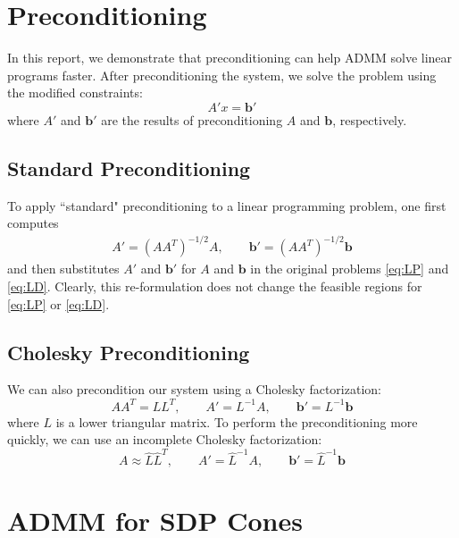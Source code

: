 \documentclass{article}
\begin{document}
\section{Preconditioning}
In this report, we demonstrate that preconditioning can help ADMM solve linear programs faster. After preconditioning the system, we solve the problem using the modified constraints: 
\begin{equation}
A' x = \mathbf{b}'
\end{equation}
where $A'$ and $\mathbf{b}'$ are the results of preconditioning $A$ and $\mathbf{b}$, respectively.
\subsection*{Standard Preconditioning}
To apply ``standard" preconditioning to a linear programming problem, one first computes 
\begin{align}
A' = (AA^T )^{-1/2}A , \quad \quad \mathbf{b}' =(AA^T )^{-1/2}\mathbf{b}
\end{align}
and then substitutes $A'$ and $\mathbf{b}'$ for $A$ and $\mathbf{b}$ in the original problems \eqref{eq:LP} and \eqref{eq:LD}. Clearly, this re-formulation does not change the feasible regions for  \eqref{eq:LP} or \eqref{eq:LD}. 

\subsection*{Cholesky Preconditioning}

We  can also precondition our system using a Cholesky factorization:
\[
AA^{T}=LL^{T}, \quad \quad A'=L^{-1}A, \quad \quad \mathbf{b}'=L^{-1}\mathbf{b}
\]
where $L$ is a lower triangular matrix. To perform the preconditioning more quickly, we can use an incomplete Cholesky factorization:
\[
A\approx \hat{L}\hat{L}^{T}, \quad \quad A'=\hat{L}^{-1}A, \quad \quad \mathbf{b}'=\hat{L}^{-1}\mathbf{b}
\]

\section{ADMM for SDP Cones}
\end{document}
